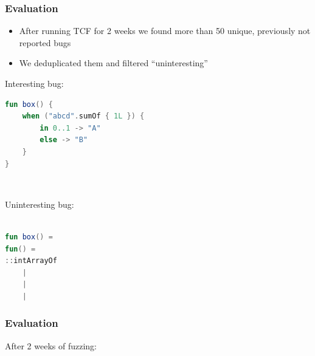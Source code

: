 \begin{frame}[fragile]
	\frametitle{Evaluation}
	\begin{itemize}
		\item After running TCF for 2 weeks we found more than 50 unique, previously not reported bugs
		\item We deduplicated them and filtered ``uninteresting''
	\end{itemize}
	\begin{minipage}{0.4\linewidth}
Interesting bug:
		\begin{lstlisting}[language=Kotlin,basicstyle=\tiny]
fun box() {
    when ("abcd".sumOf { 1L }) {
        in 0..1 -> "A"
        else -> "B"
    }
}
 \end{lstlisting}
	\end{minipage}
	\begin{minipage}{0.1\linewidth}
	\ \ 
	\end{minipage}
	\begin{minipage}{0.4\linewidth}
Uninteresting bug:
		\begin{lstlisting}[language=Kotlin,basicstyle=\tiny, escapechar = |]
		
fun box() = 
fun() = 
::intArrayOf
	|
	|
	|
	\end{lstlisting}
\end{minipage}
\end{frame}

\begin{frame}[fragile]
	\frametitle{Evaluation}
	After 2 weeks of fuzzing:
	\ \\ \ \\ \ \\
\end{frame}


